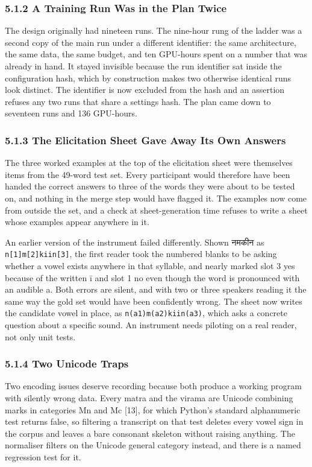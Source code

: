\documentclass[12pt,a4paper]{article}
\DeclareRobustCommand{\dev}[1]{{\devfont #1}}
\begin{document}
\subsubsection*{5.1.2  A Training Run Was in the Plan Twice}
The design originally had nineteen runs. The nine-hour rung of the ladder was a second copy of the main run under a different identifier: the same architecture, the same data, the same budget, and ten GPU-hours spent on a number that was already in hand. It stayed invisible because the run identifier sat inside the configuration hash, which by construction makes two otherwise identical runs look distinct. The identifier is now excluded from the hash and an assertion refuses any two runs that share a settings hash. The plan came down to seventeen runs and 136 GPU-hours.

\subsubsection*{5.1.3  The Elicitation Sheet Gave Away Its Own Answers}
The three worked examples at the top of the elicitation sheet were themselves items from the 49-word test set. Every participant would therefore have been handed the correct answers to three of the words they were about to be tested on, and nothing in the merge step would have flagged it. The examples now come from outside the set, and a check at sheet-generation time refuses to write a sheet whose examples appear anywhere in it.

An earlier version of the instrument failed differently. Shown \dev{नमकीन} as \texttt{n[1]m[2]kiin[3]}, the first reader took the numbered blanks to be asking whether a vowel exists anywhere in that syllable, and nearly marked slot 3 yes because of the written ī and slot 1 no even though the word is pronounced with an audible a. Both errors are silent, and with two or three speakers reading it the same way the gold set would have been confidently wrong. The sheet now writes the candidate vowel in place, as \texttt{n(a1)m(a2)kiin(a3)}, which asks a concrete question about a specific sound. An instrument needs piloting on a real reader, not only unit tests.

\subsubsection*{5.1.4  Two Unicode Traps}
Two encoding issues deserve recording because both produce a working program with silently wrong data. Every matra and the virama are Unicode combining marks in categories Mn and Mc [13], for which Python's standard alphanumeric test returns false, so filtering a transcript on that test deletes every vowel sign in the corpus and leaves a bare consonant skeleton without raising anything. The normaliser filters on the Unicode general category instead, and there is a named regression test for it.
\end{document}
